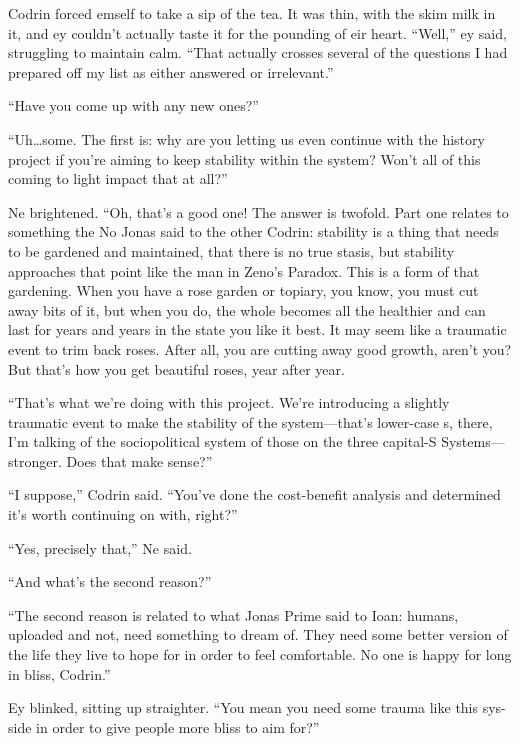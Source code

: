 Codrin forced emself to take a sip of the tea. It was thin, with the skim milk in it, and ey couldn't actually taste it for the pounding of eir heart. ``Well,'' ey said, struggling to maintain calm. ``That actually crosses several of the questions I had prepared off my list as either answered or irrelevant.''

``Have you come up with any new ones?''

``Uh\ldots some. The first is: why are you letting us even continue with the history project if you're aiming to keep stability within the system? Won't all of this coming to light impact that at all?''

Ne brightened. ``Oh, that's a good one! The answer is twofold. Part one relates to something the No Jonas said to the other Codrin: stability is a thing that needs to be gardened and maintained, that there is no true stasis, but stability approaches that point like the man in Zeno's Paradox. This is a form of that gardening. When you have a rose garden or topiary, you know, you must cut away bits of it, but when you do, the whole becomes all the healthier and can last for years and years in the state you like it best. It may seem like a traumatic event to trim back roses. After all, you are cutting away good growth, aren't you? But that's how you get beautiful roses, year after year.

``That's what we're doing with this project. We're introducing a slightly traumatic event to make the stability of the system---that's lower-case s, there, I'm talking of the sociopolitical system of those on the three capital-S Systems---stronger. Does that make sense?''

``I suppose,'' Codrin said. ``You've done the cost-benefit analysis and determined it's worth continuing on with, right?''

``Yes, precisely that,'' Ne said.

``And what's the second reason?''

``The second reason is related to what Jonas Prime said to Ioan: humans, uploaded and not, need something to dream of. They need some better version of the life they live to hope for in order to feel comfortable. No one is happy for long in bliss, Codrin.''

Ey blinked, sitting up straighter. ``You mean you need some trauma like this sys-side in order to give people more bliss to aim for?''

